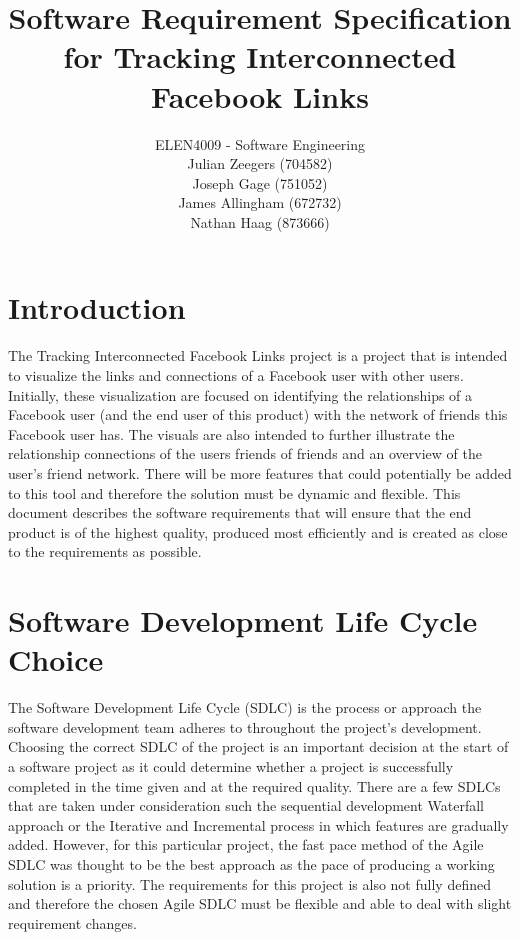 \documentclass[10pt,onecolumn]{article}
\title{\vspace{-4.2cm}Software Requirement Specification for Tracking Interconnected Facebook Links }
\author{ ELEN4009 - Software Engineering\\ Julian Zeegers (704582) \\  Joseph Gage (751052)\\ James Allingham (672732) \\ Nathan Haag (873666)}
\begin{document}
\date{\vspace{-5ex}}
\maketitle
\pagestyle{plain}
\setcounter{page}{1}



\section{Introduction}
The Tracking Interconnected Facebook Links project is a project that  is intended to visualize the links and connections of a Facebook user with other users. Initially, these visualization are focused on identifying the relationships of a Facebook user (and the end user of this product) with the network of friends this Facebook user has. The visuals are also intended to further illustrate the relationship connections of the users friends of friends and an overview of the user's friend network. There will be more features that could potentially be added to this tool and therefore the solution must be dynamic and flexible. This document describes the software requirements that will ensure that the end product is of the highest quality, produced most efficiently and is created as close to the requirements as possible.

\section{Software Development Life Cycle Choice}
The Software Development Life Cycle (SDLC) is the process or approach the software development team adheres to throughout the project's development. Choosing the correct SDLC of the project is an important decision at the start of a software project as it could determine whether a project is successfully completed in the time given and at the required quality. There are a few SDLCs that are taken under consideration such the sequential development Waterfall approach or the Iterative and Incremental process in which features are gradually added. However, for this particular project, the fast pace method of the Agile SDLC was thought to be the best approach as the pace of producing a working solution is a priority. The requirements for this project is also not fully defined and therefore the chosen Agile SDLC must be flexible and able to deal with slight requirement changes.
\end{document}
